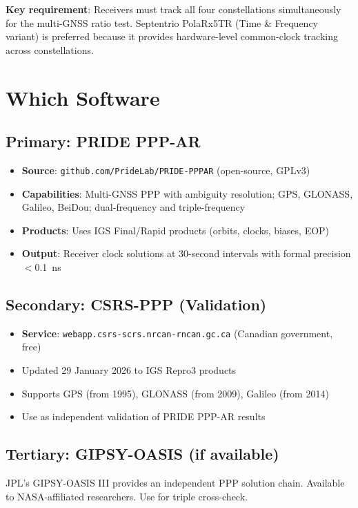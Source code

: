 \documentclass[11pt]{article}
\begin{document}
\textbf{Key requirement}: Receivers must track all four constellations
simultaneously for the multi-GNSS ratio test. Septentrio PolaRx5TR
(Time \& Frequency variant) is preferred because it provides
hardware-level common-clock tracking across constellations.

\section{Which Software}

\subsection{Primary: PRIDE PPP-AR}

\begin{itemize}[nosep]
\item \textbf{Source}: \texttt{github.com/PrideLab/PRIDE-PPPAR}
  (open-source, GPLv3)
\item \textbf{Capabilities}: Multi-GNSS PPP with ambiguity resolution;
  GPS, GLONASS, Galileo, BeiDou; dual-frequency and triple-frequency
\item \textbf{Products}: Uses IGS Final/Rapid products (orbits, clocks,
  biases, EOP)
\item \textbf{Output}: Receiver clock solutions at 30-second intervals
  with formal precision $<$0.1~ns
\end{itemize}

\subsection{Secondary: CSRS-PPP (Validation)}

\begin{itemize}[nosep]
\item \textbf{Service}: \texttt{webapp.csrs-scrs.nrcan-rncan.gc.ca}
  (Canadian government, free)
\item Updated 29 January 2026 to IGS Repro3 products
\item Supports GPS (from 1995), GLONASS (from 2009), Galileo (from 2014)
\item Use as independent validation of PRIDE PPP-AR results
\end{itemize}

\subsection{Tertiary: GIPSY-OASIS (if available)}

JPL's GIPSY-OASIS III provides an independent PPP solution chain.
Available to NASA-affiliated researchers. Use for triple cross-check.
\end{document}
